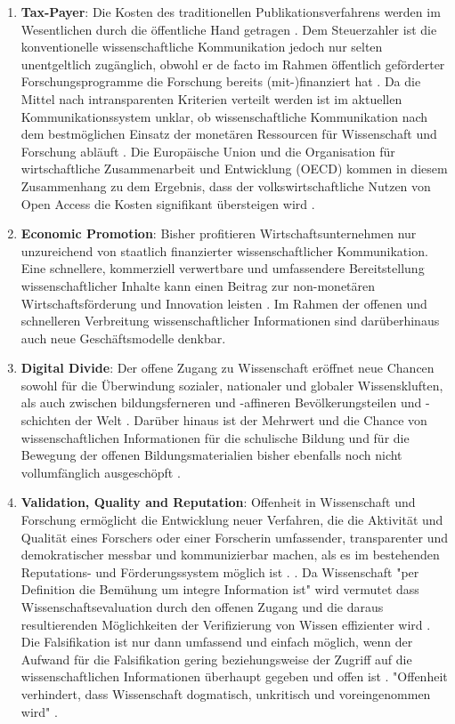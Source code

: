 \begin{enumerate}
\item \textbf{Tax-Payer}: Die Kosten des traditionellen Publikationsverfahrens werden im Wesentlichen durch die öffentliche Hand getragen \cite{Mueller_2010}. Dem Steuerzahler ist die konventionelle wissenschaftliche Kommunikation jedoch nur selten unentgeltlich zugänglich, obwohl er de facto im Rahmen öffentlich geförderter Forschungsprogramme die Forschung bereits (mit-)finanziert hat \cite{Suber_2003b} \cite{Resnik_2005} \cite{Baggs_2006} \cite{Woelfle_2011} \cite{Beverungen_2012} \cite{Adema_2014}. Da die Mittel nach intransparenten Kriterien verteilt werden ist im aktuellen Kommunikationssystem unklar, ob wissenschaftliche Kommunikation nach dem bestmöglichen Einsatz der monetären Ressourcen für Wissenschaft und Forschung abläuft \cite{Glasziou_2014} \cite{Altman_1994}. Die Europäische Union und die Organisation für wirtschaftliche Zusammenarbeit und Entwicklung (OECD) kommen in diesem Zusammenhang zu dem Ergebnis, dass der volkswirtschaftliche Nutzen von Open Access die Kosten signifikant übersteigen wird \cite{Cloes_2009} \cite{OECD_2015} \cite{EU_Council_2007}.
\item \textbf{Economic Promotion}: Bisher profitieren Wirtschaftsunternehmen nur unzureichend von staatlich finanzierter wissenschaftlicher Kommunikation. Eine schnellere, kommerziell verwertbare und umfassendere Bereitstellung wissenschaftlicher Inhalte kann einen Beitrag zur non-monetären Wirtschaftsförderung und Innovation leisten \cite{European_Commission_2015a} \cite{OECD_2015} \cite{Heise_2012b} \cite{OECD_2004}. Im Rahmen der offenen und schnelleren Verbreitung wissenschaftlicher Informationen sind darüberhinaus auch neue Geschäftsmodelle denkbar.
\item \textbf{Digital Divide}: Der offene Zugang zu Wissenschaft eröffnet neue Chancen sowohl für die Überwindung sozialer, nationaler und globaler Wissenskluften, als auch zwischen bildungsferneren und -affineren Bevölkerungsteilen und -schichten der Welt \cite{BOAI_2012}. Darüber hinaus ist der Mehrwert und die Chance von wissenschaftlichen Informationen für die schulische Bildung und für die Bewegung der offenen Bildungsmaterialien bisher ebenfalls noch nicht vollumfänglich ausgeschöpft \cite{Heise_2013b}.
\item \textbf{Validation, Quality and Reputation}: Offenheit in Wissenschaft und Forschung ermöglicht die Entwicklung neuer Verfahren, die die Aktivität und Qualität eines Forschers oder einer Forscherin umfassender, transparenter und demokratischer messbar und kommunizierbar machen, als es im bestehenden Reputations- und Förderungssystem möglich ist \cite{Grand_2012}. \cite{Chalmers_2009}. Da Wissenschaft "per Definition die Bemühung um integre Information ist" \cite{Umstaetter_2007} wird vermutet dass Wissenschaftsevaluation durch den offenen Zugang und die daraus resultierenden Möglichkeiten der Verifizierung von Wissen effizienter wird \cite{Nosek_2015}. Die Falsifikation ist nur dann umfassend und einfach möglich, wenn der Aufwand für die Falsifikation gering beziehungsweise der Zugriff auf die wissenschaftlichen Informationen überhaupt gegeben \cite{Umstaetter_2007} und offen ist \cite{Peters_2014}. "Offenheit verhindert, dass Wissenschaft dogmatisch, unkritisch und voreingenommen wird" \cite{Resnik_2005}.

\end{enumerate}
